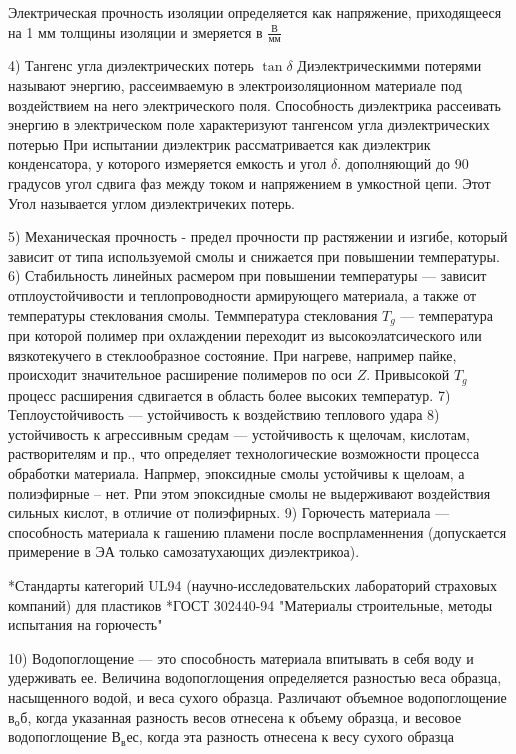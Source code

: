 \documentclass{article}
\begin{document}
Электрическая прочность изоляции определяется как напряжение, приходящееся на 1 мм толщины изоляции и змеряется в $\frac {В} {мм}$

4) Тангенс угла диэлектрических потерь $\tan{\delta}$
Диэлектрическимми потерями называют энергию, рассеимваемую в электроизоляционном материале под воздействием на него электрического поля.
Способность диэлектрика рассеивать энергию в электрическом поле характеризуют тангенсом угла диэлектрических потерью
При испытании диэлектрик рассматривается как диэлектрик конденсатора, у которого измеряется емкость и угол $\delta$. дополняющий до 90 градусов угол сдвига фаз между током и напряжением в умкостной цепи. Этот Угол называется углом диэлектричеких потерь.

5) Механическая прочность - предел прочности пр растяжении и изгибе, который зависит от типа используемой смолы и снижается при повышении температуры.
6) Стабильность линейных расмером при повышении температуры --- зависит отплоустойчивости и теплопроводности армирующего материала, а также от температуры стеклования смолы.
Теммпература стеклования $T_g$ --- температура при которой полимер при охлаждении переходит из высокоэлатсического или вязкотекучего в стеклообразное состояние.
При нагреве, например пайке, происходит значительное расширение полимеров по оси $Z$. Привысокой $T_g$ процесс расширения сдвигается в область более высоких температур.
7) Теплоустойчивость --- устойчивость к воздействию теплового удара
8) устойчивость к агрессивным средам --- устойчивость к щелочам, кислотам, растворителям и пр., что определяет технологические возможности процесса обработки материала.
Напрмер, эпоксидные смолы устойчивы к щелоам, а полиэфирные -- нет. Рпи этом эпоксидные смолы не выдерживают воздействия сильных кислот, в отличие от полиэфирных.
9) Горючесть материала --- способность материала к гашению пламени после воспрламеннения (допускается примерение в ЭА только самозатухающих диэлектрикоа).

*Стандарты категорий UL94 (научно-исследовательских лабораторий страховых компаний) для пластиков
*ГОСТ 302440-94 "Материалы строительные, методы испытания на горючесть"

10) Водопоглощение --- это способность материала впитывать в себя воду и удерживать ее. Величина водопоглощения определяется разностью веса образца, насыщенного водой, и веса сухого образца. Различают объемное водопоглощение $в_об$, когда указанная разность весов отнесена к объему образца, и весовое водопоглощение $В_вес$, когда эта разность отнесена к весу сухого образца
\end{document}
